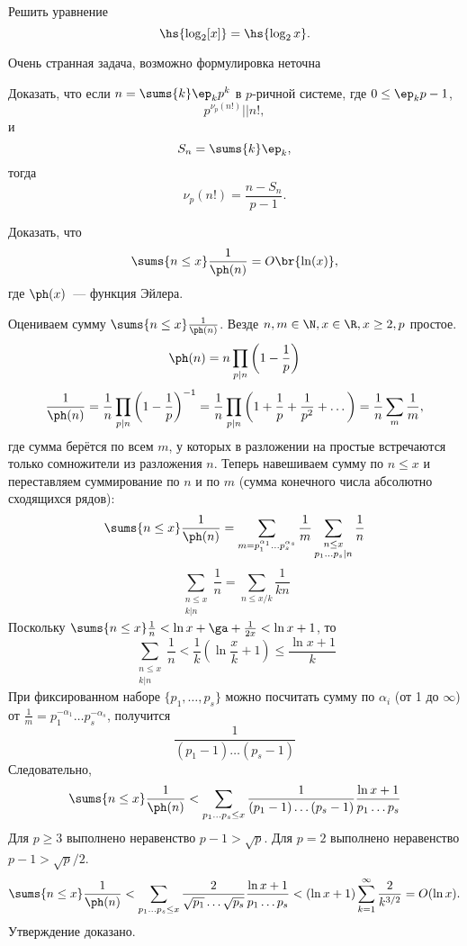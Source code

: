 \documentclass{article}
\begin{document}
\begin{problem}
Решить уравнение
$$\hs{\log_2[x]} = \hs{\log_2 x}.$$
\end{problem}

\begin{problem}

\begin{petit}
Очень странная задача, возможно формулировка неточна
\end{petit}

Доказать, что если $n = \sums{k} \ep_k p^k$ в $p$-ричной системе,
где $0 \le \ep_k p - 1$,
$$
    p^{\nu_p(n!)} || n!,
$$
и
$$
    S_n = \sums{k} \ep_k,
$$
тогда
$$
    \nu_p(n!) = \frac{n - S_n}{p - 1}.
$$
\end{problem}

\begin{problem}
Доказать, что
$$
    \sums{n \le x} \frac1{\ph(n)} = O\br{\ln(x)},
$$
где $\ph(x)$~--- функция Эйлера.
\end{problem}

\begin{solution}
Оцениваем сумму $\sums{n\le x}\frac1{\ph(n)}$. Везде $n,m\in\N, x\in\R, x\ge2, p$ простое.
$$
\ph(n)=n\prod_{p|n}\left(1-\frac1p\right)
$$
$$
\frac1{\ph(n)}=\frac1n\prod_{p|n}\left(1-\frac1p\right)^{-1}=\frac1n\prod_{p|n}
\left(1+\frac1p+\frac1{p^2}+\dots\right)=\frac1n\sum_m\frac1m,
$$
где сумма берётся по всем $m$, у которых в разложении на простые встречаются только
сомножители из разложения $n$. Теперь навешиваем сумму по $n\le x$ и переставляем суммирование
по $n$ и по $m$ (сумма конечного числа абсолютно сходящихся рядов):
\begin{equation}
\sums{n\le x}\frac1{\ph(n)}=\sum_
{m=p_1^{\alpha_1}\dots p_s^{\alpha_s}}\frac1m\sum_
{\substack{n\le x\\p_1\dots p_s|n}}\frac1n
\end{equation}
$$
\sum_{\substack{n\le x\\k|n}}\frac1n=\sum_{n\le x/k}\frac1{kn}
$$
Поскольку $\sums{n\le x}\frac1n<\ln x+\ga+\frac1{2x}<\ln x+1$, то
$$
\sum_{\substack{n\le x\\k|n}}\frac1n<\frac1k\left(\ln\frac xk+1\right)\le
\frac{\ln x+1}k
$$
При фиксированном наборе $\{p_1,\dots,p_s\}$ можно посчитать сумму по $\alpha_i$ (от 1 до
$\infty$) от $\frac1m=p_1^{-\alpha_1}\dots p_s^{-\alpha_s}$, получится
$$
\frac1{(p_1-1)\dots(p_s-1)}
$$
Следовательно,
$$
\sums{n\le x}\frac1{\ph(n)}<\sum_{p_1\dots p_s\le x}\frac1{(p_1-1)\dots(p_s-1)}
\frac{\ln x+1}{p_1\dots p_s}
$$
Для $p\ge3$ выполнено неравенство $p-1>\sqrt{p}$. Для $p=2$ выполнено
неравенство $p-1>\sqrt{p}/2$.
$$
\sums{n\le x}\frac1{\ph(n)}<\sum_{p_1\dots p_s\le x}\frac2{\sqrt{p_1}\dots\sqrt{p_s}}
\frac{\ln x+1}{p_1\dots p_s}<
(\ln x+1)\sum_{k=1}^\infty \frac2{k^{3/2}}=O(\ln x).
$$
Утверждение доказано.
\end{solution}
\end{document}
